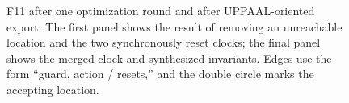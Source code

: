 \begin{figure}[!t]
\centering
\resizebox{\textwidth}{!}{}
\caption{F11 after one optimization round and after UPPAAL-oriented export.
The first panel shows the result of removing an unreachable location and the
two synchronously reset clocks; the final panel shows the merged clock and
synthesized invariants. Edges use the form ``guard, action / resets,'' and the
double circle marks the accepting location.}
\label{fig:running-pipeline}
\end{figure}
